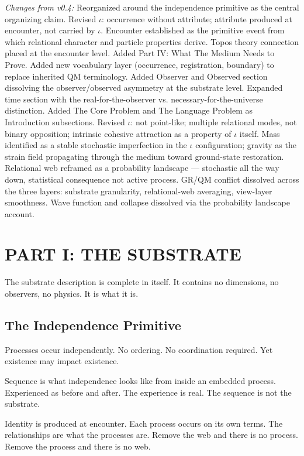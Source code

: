 \documentclass[11pt,letterpaper]{article}
\begin{document}
\emph{Changes from v0.4:} Reorganized around the independence primitive as the central organizing claim. Revised \(\iota\): occurrence without attribute; attribute produced at encounter, not carried by \(\iota\). Encounter established as the primitive event from which relational character and particle properties derive. Topos theory connection placed at the encounter level. Added Part IV: What The Medium Needs to Prove. Added new vocabulary layer (occurrence, registration, boundary) to replace inherited QM terminology. Added Observer and Observed section dissolving the observer/observed asymmetry at the substrate level. Expanded time section with the real-for-the-observer vs. necessary-for-the-universe distinction. Added The Core Problem and The Language Problem as Introduction subsections. Revised \(\iota\): not point-like; multiple relational modes, not binary opposition; intrinsic cohesive attraction as a property of \(\iota\) itself. Mass identified as a stable stochastic imperfection in the \(\iota\) configuration; gravity as the strain field propagating through the medium toward ground-state restoration. Relational web reframed as a probability landscape --- stochastic all the way down, statistical consequence not active process. GR/QM conflict dissolved across the three layers: substrate granularity, relational-web averaging, view-layer smoothness. Wave function and collapse dissolved via the probability landscape account.


\section{PART I: THE SUBSTRATE}
\label{sec:org3d2596a}

The substrate description is complete in itself. It contains no dimensions, no observers, no physics. It is what it is.

\subsection{The Independence Primitive}
\label{sec:org22187dd}


Processes occur independently. No ordering. No coordination required. Yet existence may impact existence.

Sequence is what independence looks like from inside an embedded process. Experienced as before and after. The experience is real. The sequence is not the substrate.

Identity is produced at encounter. Each process occurs on its own terms. The relationships are what the processes are. Remove the web and there is no process. Remove the process and there is no web.
\end{document}
